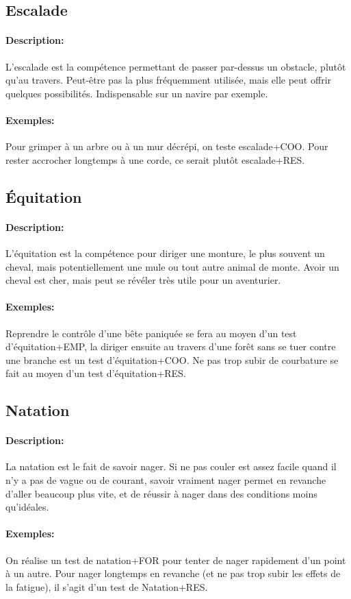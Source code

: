\documentclass[10pt,a4paper,twocolumn]{book}
\begin{document}
\subsection{Escalade}
\paragraph{Description:}L'escalade est la compétence permettant de passer par-dessus un obstacle, plutôt qu'au travers. Peut-être pas la plus fréquemment utilisée, mais elle peut offrir quelques possibilités. Indispensable sur un navire par exemple.
\paragraph{Exemples:}Pour grimper à un arbre ou à un mur décrépi, on teste escalade+COO. Pour rester accrocher longtemps à une corde, ce serait plutôt escalade+RES.
\subsection{Équitation}
\paragraph{Description:}L'équitation est la compétence pour diriger une monture, le plus souvent un cheval, mais potentiellement une mule ou tout autre animal de monte. Avoir un cheval est cher, mais peut se révéler très utile pour un aventurier.
\paragraph{Exemples:}Reprendre le contrôle d'une bête paniquée se fera au moyen d'un test d'équitation+EMP, la diriger ensuite au travers d'une forêt sans se tuer contre une branche est un test d'équitation+COO. Ne pas trop subir de courbature se fait au moyen d'un test d'équitation+RES.
\subsection{Natation}
\paragraph{Description:}La natation est le fait de savoir nager. Si ne pas couler est assez facile quand il n'y a pas de vague ou de courant, savoir vraiment nager permet en revanche d'aller beaucoup plus vite, et de réussir à nager dans des conditions moins qu'idéales.
\paragraph{Exemples:}On réalise un test de natation+FOR pour tenter de nager rapidement d'un point à un autre. Pour nager longtemps en revanche (et ne pas trop subir les effets de la fatigue), il s'agit d'un test de Natation+RES.
\end{document}
